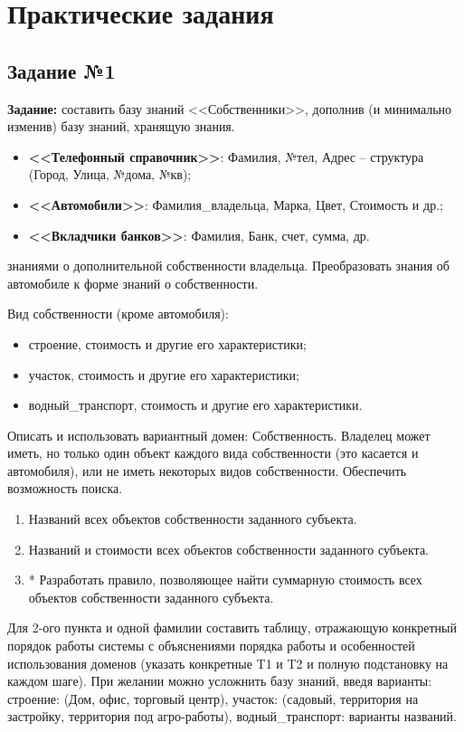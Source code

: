 \chapter{Практические задания}
\section{Задание №1}
\textbf{Задание:} составить базу знаний <<Собственники>>, дополнив (и минимально изменив) базу знаний, хранящую знания.
\begin{itemize}
	\item \textbf{<<Телефонный справочник>>}: Фамилия, №тел, Адрес -- структура (Город, Улица, №дома, №кв);
	\item \textbf{<<Автомобили>>}: Фамилия\_владельца, Марка, Цвет, Стоимость и др.;
	\item \textbf{<<Вкладчики банков>>}: Фамилия, Банк, счет, сумма, др.
\end{itemize}
знаниями о дополнительной собственности владельца. Преобразовать знания об автомобиле к форме знаний о собственности.

Вид собственности (кроме автомобиля):
\begin{itemize}
	\item строение, стоимость и другие его характеристики;
	\item участок, стоимость и другие его характеристики;
	\item водный\_транспорт, стоимость и другие его характеристики.
\end{itemize}

Описать и использовать вариантный домен: Собственность. Владелец может иметь, но только один объект каждого вида собственности (это касается и автомобиля), или не  иметь некоторых видов собственности. Обеспечить возможность поиска.
\begin{enumerate}
	\item Названий всех объектов собственности заданного субъекта.
	\item Названий и стоимости всех объектов собственности заданного субъекта.
	\item * Разработать правило, позволяющее найти суммарную стоимость всех объектов собственности заданного субъекта.
\end{enumerate}

Для 2-ого пункта и одной фамилии составить таблицу, отражающую конкретный порядок работы системы с объяснениями порядка работы и особенностей использования доменов (указать конкретные T1 и T2 и полную подстановку на каждом шаге). При желании можно усложнить базу знаний, введя варианты: строение: (Дом, офис, торговый центр), участок: (садовый, территория на застройку, территория под агро-работы), водный\_транспорт: варианты названий.

